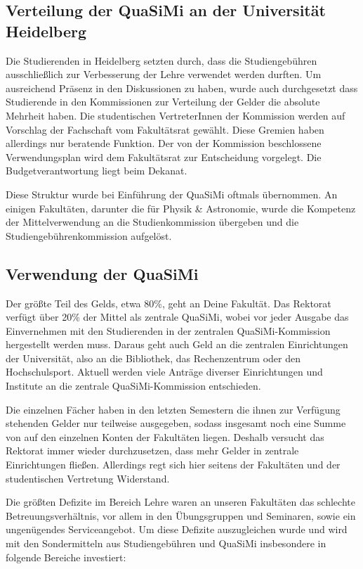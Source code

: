 \subsection*{Verteilung der QuaSiMi an der Universität Heidelberg}

Die Studierenden in Heidelberg setzten durch, dass die Studiengebühren ausschließlich zur Verbesserung der Lehre verwendet werden durften. Um ausreichend Präsenz in den Diskussionen zu haben, wurde auch durchgesetzt dass Studierende in den Kommissionen zur Verteilung der Gelder die absolute Mehrheit haben. Die studentischen VertreterInnen der Kommission werden auf Vorschlag der Fachschaft vom Fakultätsrat gewählt. Diese Gremien haben allerdings nur beratende Funktion. Der von der Kommission beschlossene Verwendungsplan wird dem Fakultätsrat zur Entscheidung vorgelegt. Die Budgetverantwortung liegt beim Dekanat.

Diese Struktur wurde bei Einführung der QuaSiMi oftmals übernommen. An einigen Fakultäten, darunter die für Physik \& Astronomie, wurde die Kompetenz der Mittelverwendung an die Studienkommission übergeben und die Studiengebührenkommission aufgelöst.

\subsection*{Verwendung der QuaSiMi}

Der größte Teil des Gelds, etwa 80\%, geht an Deine Fakultät. Das Rektorat verfügt über 20\% der Mittel als zentrale QuaSiMi, wobei vor jeder Ausgabe das Einvernehmen mit den Studierenden in der zentralen QuaSiMi-Kommission hergestellt werden muss. Daraus geht auch Geld an die zentralen Einrichtungen der Universität, also an die Bibliothek, das Rechenzentrum oder den Hochschulsport. Aktuell werden viele Anträge diverser Einrichtungen und Institute an die zentrale QuaSiMi-Kommission entschieden.

Die einzelnen Fächer haben in den letzten Semestern die ihnen zur Verfügung stehenden Gelder nur teilweise ausgegeben, sodass insgesamt noch eine Summe von
 auf den einzelnen Konten der Fakultäten liegen. Deshalb versucht das Rektorat immer wieder durchzusetzen, dass mehr Gelder in zentrale Einrichtungen fließen. Allerdings regt sich hier seitens der Fakultäten und der studentischen Vertretung Widerstand.

Die größten Defizite im Bereich Lehre waren an unseren Fakultäten das schlechte Betreuungsverhältnis, vor allem in den Übungsgruppen und Seminaren, sowie ein ungenügendes Serviceangebot. Um diese Defizite auszugleichen wurde und wird mit den Sondermitteln aus Studiengebühren und QuaSiMi insbesondere in folgende Bereiche investiert:

